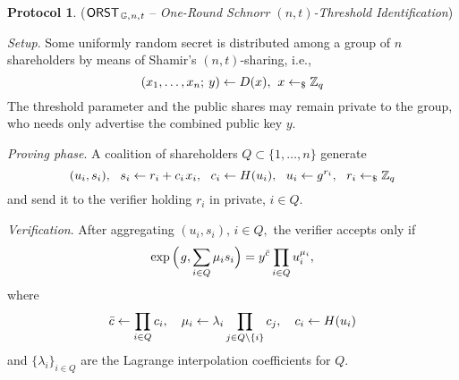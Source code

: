 \documentclass[10pt, psamsfonts, reqno]{amsart}
\theoremstyle{definition}
\newtheorem{protocol}[thm]{Protocol}
\theoremstyle{remark}
\numberwithin{equation}{section}
\begin{document}
\begin{protocol}\label{orst_protocol}
($
\mathsf{ORST}
	_{\hspace{1pt}\mathbb{G},\hspace{0.5pt} n,\hspace{0.5pt} t}
$
-- \textit{One-Round Schnorr $(n, t)$-Threshold Identification})
\enumerate[label=$\circ$, leftmargin=17pt]
\vspace{2pt}
\item \textit{Setup}. Some uniformly random secret is
distributed among a group of $n$ shareholders
by means of Shamir's $(n, t)$-sharing, i.e.,
\vspace{5pt}
\begin{equation*}\label{orst_sharing}
(x_1, \dots, x_n;\hspace{2pt} y) \leftarrow D(x),
\hspace{4pt} x \leftarrow_\$ \mathbb{Z}_q
\vspace{5pt}
\end{equation*}
The threshold parameter and the public shares may remain private to the group,
who needs only advertise the combined public key $y$.
\vspace{5pt}
\item \textit{Proving phase}. A coalition of shareholders
$Q \subset \{1, \dots, n\}$ generate
\vspace{5pt}
\begin{equation*}
(u_i, s_i),
\ \ s_i \leftarrow r_i + c_i\hspace{1pt} x_i,
\ \ c_i \leftarrow H(u_i),
\ \ u_i \leftarrow g ^ {r_i},
\ \ r_i \leftarrow_\$ \mathbb{Z}_q
\vspace{5pt}
\end{equation*}
and send it to the verifier holding $r_i$ in private, $i \in Q$.
\vspace{5pt}
\item \textit{Verification}.
After aggregating $(u_i, s_i),\hspace{2pt} i \in Q,$
the verifier accepts only if
\vspace{6pt}
\begin{equation}\label{orst_verification_0}
\exp\Big(\hspace{1pt}g, \sum_{i \in Q} \mu_i s_i\Big) =
y^{\bar{c}} \prod_{i \in Q} u_i ^ {\mu_i},
\vspace{-3pt}
\end{equation}
where
\vspace{2pt}
\begin{equation}\label{orst_aliases}
\bar{c} \leftarrow \prod_{i \in Q} c_i,
\ \ \  \mu_i \leftarrow \lambda_i \prod_{j \in Q \setminus \{i\}} c_j,
\ \ \  c_i \leftarrow H(u_i)
\vspace{8pt}
\end{equation}
and $\{\lambda_i\}_{i \in Q }$ are the
Lagrange interpolation coefficients for $Q$.
\vspace{5pt}
\end{protocol}
\end{document}
